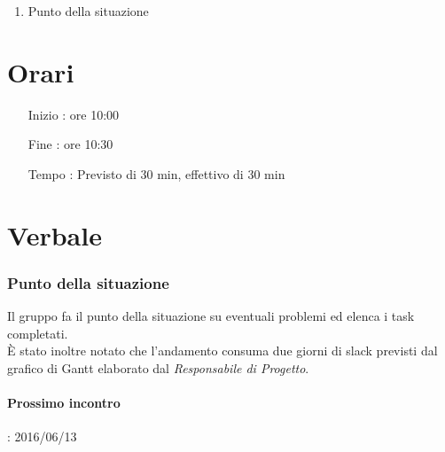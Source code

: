 \begin{enumerate}
\item Punto della situazione
\end{enumerate}

\section{Orari}

\begin{itemize}
\item[Inizio]: ore 10:00
\item[Fine]: ore 10:30
\item[Tempo]: Previsto di 30 min, effettivo di 30 min

\end{itemize}

\section{Verbale}

\subsubsection{Punto della situazione}
Il gruppo fa il punto della situazione su eventuali problemi ed elenca i task completati. \\ 
È stato inoltre notato che l'andamento consuma due giorni di slack previsti dal grafico di Gantt 
elaborato dal \textit{Responsabile di Progetto}.
\paragraph*{Prossimo incontro}: 2016/06/13


